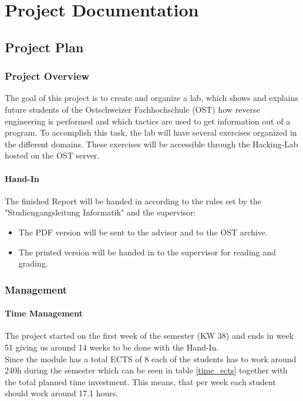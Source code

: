 \chapter{Project Documentation}
\section{Project Plan}
\subsection{Project Overview}
The goal of this project is to create and organize a lab, which shows and explains future students of the Ostschweizer Fachhochschule (OST) how reverse engineering is performed and which tactics are used to get information out of a program. To accomplish this task, the lab will have several exercises organized in the different domains. These exercises will be accessible through the Hacking-Lab hosted on the OST server. 

\subsubsection*{Hand-In}
The finished Report will be handed in according to the rules set by the "Studiengangsleitung Informatik" and the supervisor:
\begin{itemize}
    \item The PDF version will be sent to the advisor and to the OST archive.
    \item The printed version will be handed in to the supervisor for reading and grading.
\end{itemize}

\subsection{Management}
\subsubsection*{Time Management}
The project started on the first week of the semester (KW 38) and ends in week 51 giving us around 14 weeks to be done with the Hand-In. \\
Since the module has a total ECTS of 8 each of the students has to work around 240h during the semester which can be seen in table \ref{time_ects} together with the total planned time investment. This means, that per week each student should work around 17.1 hours.

